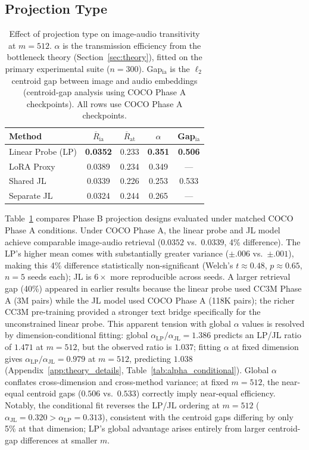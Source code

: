 \documentclass{article}
\newcommand{\avgR}{\overline{R}}
\begin{document}
\subsection{Projection Type}
\label{sec:projtype}

\begin{table}[tbp]
  \caption{Effect of projection type on image-audio transitivity at $m=512$.
  $\alpha$ is the transmission efficiency from the bottleneck theory (Section~\ref{sec:theory}), fitted on the primary experimental suite ($n=300$).
  Gap$_\mathrm{ia}$ is the $\ell_2$ centroid gap between image and audio embeddings (centroid-gap analysis using COCO Phase A checkpoints).
  All rows use COCO Phase A checkpoints.}
  \label{tab:projtype}
  \centering
  \footnotesize
  \begin{tabular}{lcccc}
    \toprule
    Method & $\avgR_\mathrm{ia}$ & $\avgR_\mathrm{at}$ & $\alpha$ & Gap$_\mathrm{ia}$ \\
    \midrule
    Linear Probe (LP) & \bf{0.0352} & 0.233 & \bf{0.351} & \bf{0.506} \\
    LoRA Proxy        & 0.0389 & 0.234 & 0.349 & --- \\
    Shared JL         & 0.0339 & 0.226 & 0.253 & 0.533 \\
    Separate JL       & 0.0324 & 0.244 & 0.265 & --- \\
    \bottomrule
  \end{tabular}
\end{table}

Table~\ref{tab:projtype} compares Phase B projection designs evaluated under matched COCO Phase A conditions.
Under COCO Phase A, the linear probe and JL model achieve comparable image-audio retrieval ($0.0352$ vs.\ $0.0339$, 4\% difference).
The LP's higher mean comes with substantially greater variance ($\pm.006$ vs.\ $\pm.001$), making this 4\% difference statistically non-significant (Welch's $t\approx 0.48$, $p\approx 0.65$, $n=5$ seeds each); JL is $6\times$ more reproducible across seeds.
A larger retrieval gap (40\%) appeared in earlier results because the linear probe used CC3M Phase A (3M pairs) while the JL model used COCO Phase A (118K pairs); the richer CC3M pre-training provided a stronger text bridge specifically for the unconstrained linear probe.
This apparent tension with global $\alpha$ values is resolved by dimension-conditional fitting:
global $\alpha_\mathrm{LP}/\alpha_\mathrm{JL}=1.386$ predicts an LP/JL ratio of $1.471$ at $m=512$, but the observed ratio is $1.037$;
fitting $\alpha$ at fixed dimension gives $\alpha_\mathrm{LP}/\alpha_\mathrm{JL}=0.979$ at $m=512$, predicting $1.038$ (Appendix~\ref{app:theory_details}, Table~\ref{tab:alpha_conditional}).
Global $\alpha$ conflates cross-dimension and cross-method variance; at fixed $m=512$, the near-equal centroid gaps ($0.506$ vs.\ $0.533$) correctly imply near-equal efficiency.
Notably, the conditional fit reverses the LP/JL ordering at $m=512$ ($\alpha_\mathrm{JL}=0.320 > \alpha_\mathrm{LP}=0.313$), consistent with the centroid gaps differing by only 5\% at that dimension; LP's global advantage arises entirely from larger centroid-gap differences at smaller $m$.
\end{document}
